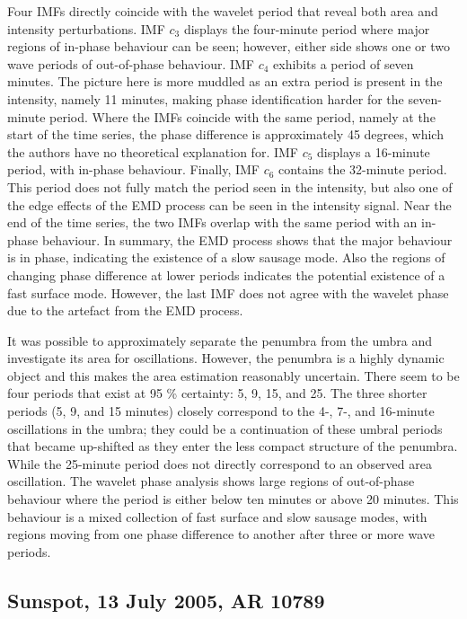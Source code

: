 	Four IMFs directly coincide with the wavelet period that reveal both area and intensity perturbations.
	IMF $c_{3}$ displays the four-minute period where major regions of in-phase behaviour can be seen; however, either side shows one or two wave periods of out-of-phase behaviour.
	IMF $c_{4}$ exhibits a period of seven minutes.
	The picture here is more muddled as an extra period is present in the intensity, namely 11 minutes, making phase identification harder for the seven-minute period.
	Where the IMFs coincide with the same period, namely at the start of the time series, the phase difference is approximately 45 degrees, which the authors have no theoretical explanation for.
	IMF $c_{5}$ displays a 16-minute period, with in-phase behaviour.
	Finally, IMF $c_{6}$ contains the 32-minute period.
	This period does not fully match the period seen in the intensity, but also one of the edge effects of the EMD process can be seen in the intensity signal.
	Near the end of the time series, the two IMFs overlap with the same period with an in-phase behaviour.
	In summary, the EMD process shows that the major behaviour is in phase, indicating the existence of a slow sausage mode.
	Also the regions of changing phase difference at lower periods indicates the potential existence of a fast surface mode.
	However, the last IMF does not agree with the wavelet phase due to the artefact from the EMD process.
	
	It was possible to approximately separate the penumbra from the umbra and investigate its area for oscillations.
	However, the penumbra is a highly dynamic object and this makes the area estimation reasonably uncertain.
	There seem to be four periods that exist at 95 \% certainty: 5, 9, 15, and 25.
	The three shorter periods (5, 9, and 15 minutes) closely correspond to the 4-, 7-, and 16-minute oscillations in the umbra; they could be a continuation of these umbral periods that became up-shifted as they enter the less compact structure of the penumbra.
	While the 25-minute period does not directly correspond to an observed area oscillation.
	The wavelet phase analysis shows large regions of out-of-phase behaviour where the period is either below ten minutes or above 20 minutes.
	This behaviour is a mixed collection of fast surface and slow sausage modes, with regions moving from one phase difference to another after three or more wave periods.

\subsection{Sunspot, 13 July 2005, AR 10789}
   

